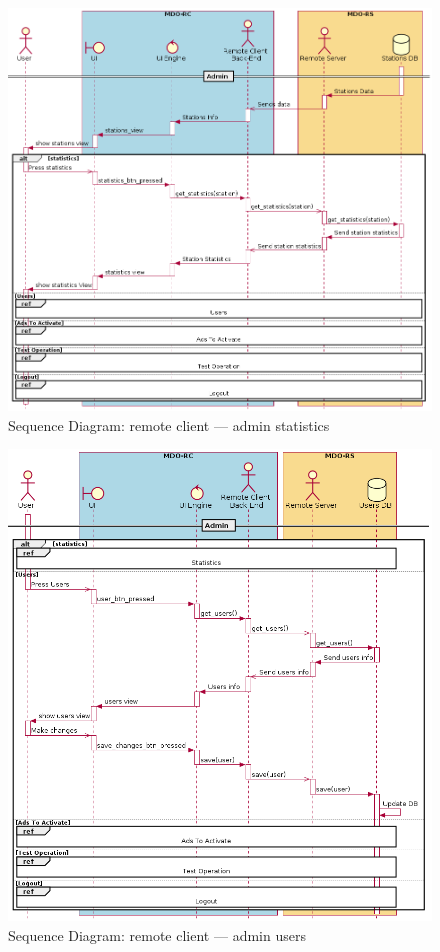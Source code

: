 \begin{figure}[htb!]
\centering
    \includegraphics[width=1\columnwidth]{./img/seq-rc-admin-statistics.png}
  \caption{Sequence Diagram: remote client --- admin statistics}%
\label{fig:seq-rc-admin-statistics}
\end{figure}

\begin{figure}[htb!]
\centering
    \includegraphics[width=1\columnwidth]{./img/seq-rc-admin-users.png}
  \caption{Sequence Diagram: remote client --- admin users}%
\label{fig:seq-rc-admin-users}
\end{figure}

